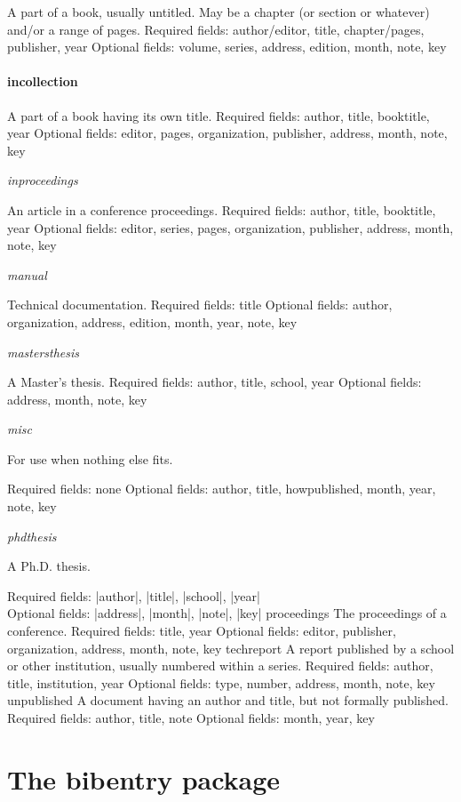\begin{refsection}
    A part of a book, usually untitled. May be a chapter (or section or whatever) and/or a range of pages.
    Required fields: author/editor, title, chapter/pages, publisher, year
    Optional fields: volume, series, address, edition, month, note, key

\paragraph{incollection}

    A part of a book having its own title.
    Required fields: author, title, booktitle, year
    Optional fields: editor, pages, organization, publisher, address, month, note, key

\emph{inproceedings}

An article in a conference proceedings.
Required fields: author, title, booktitle, year
Optional fields: editor, series, pages, organization, publisher, address, month, note, key



\emph{manual}

Technical documentation.
Required fields: title
Optional fields: author, organization, address, edition, month, year, note, key

\emph{mastersthesis}

A Master's thesis.
Required fields: author, title, school, year
Optional fields: address, month, note, key

\emph{misc}

For use when nothing else fits.

Required fields: none
Optional fields: author, title, howpublished, month, year, note, key

\emph{phdthesis}

A Ph.D. thesis.

Required fields: |author|, |title|, |school|, |year|\\
Optional fields: |address|, |month|, |note|, |key|
proceedings
The proceedings of a conference.
Required fields: title, year
Optional fields: editor, publisher, organization, address, month, note, key
techreport
A report published by a school or other institution, usually numbered within a series.
Required fields: author, title, institution, year
Optional fields: type, number, address, month, note, key
unpublished
A document having an author and title, but not formally published.
Required fields: author, title, note
Optional fields: month, year, key

\section{The bibentry package}


\end{refsection}

